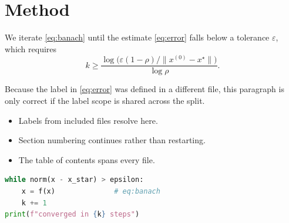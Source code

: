 \section{Method}\label{sec:method}

We iterate \eqref{eq:banach} until the estimate \eqref{eq:error} falls below a
tolerance $\varepsilon$, which requires
\begin{equation}
  k \geq \frac{\log\bigl(\varepsilon (1-\rho) / \lVert x^{(0)} - x^\star \rVert\bigr)}{\log \rho}.
\end{equation}

Because the label in \eqref{eq:error} was defined in a different file, this
paragraph is only correct if the label scope is shared across the split.

\begin{itemize}
  \item Labels from included files resolve here.
  \item Section numbering continues rather than restarting.
  \item The table of contents spans every file.
\end{itemize}

\begin{lstlisting}[language=Python]
while norm(x - x_star) > epsilon:
    x = f(x)              # eq:banach
    k += 1
print(f"converged in {k} steps")
\end{lstlisting}